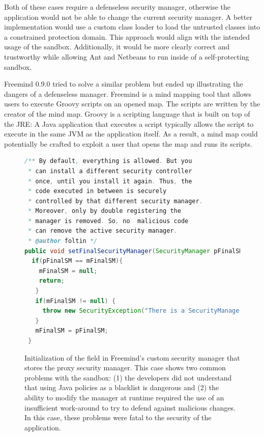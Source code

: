 \documentclass{sig-alternate}
\begin{document}
Both of these cases require a defenseless security manager, otherwise
the application would not be able to change the current security manager.
A better implementation would use a custom class
loader to load the untrusted classes into a constrained protection
domain. This approach would align with the intended usage of the sandbox.
Additionally, it would be more clearly correct and trustworthy while
allowing Ant and Netbeans to run inside of a self-protecting sandbox.

Freemind 0.9.0 tried to solve a similar problem but ended up illustrating
the dangers of a defenseless manager. Freemind is a mind mapping tool
that allows users to execute Groovy scripts on an opened map. The
scripts are written by the creator of the mind map. Groovy is a scripting
language that is built on top of the JRE: A Java application that
executes a script typically allows the script to execute in the same
JVM as the application itself. As a result, a mind map could potentially
be crafted to exploit a user that opens the map and runs its scripts.

\begin{figure}
\begin{lstlisting}[language=Java,firstnumber=31]
/** By default, everything is allowed. But you
 * can install a different security controller
 * once, until you install it again. Thus, the
 * code executed in between is securely
 * controlled by that different security manager.  
 * Moreover, only by double registering the
 * manager is removed. So, no  malicious code 
 * can remove the active security manager.  
 * @author foltin */
public void setFinalSecurityManager(SecurityManager pFinalSM) {
  if(pFinalSM == mFinalSM){
    mFinalSM = null;
    return;
   } 		
   if(mFinalSM != null) {
     throw new SecurityException("There is a SecurityManager installed already."); 		
   } 		
   mFinalSM = pFinalSM;
 }	
\end{lstlisting}
\caption{Initialization of the field in Freemind's custom security manager\label{fig:Freemind-Security-Manager}
that stores the proxy security manager. This case shows two common problems with the sandbox: (1) the developers did not understand that using Java policies as a blacklist is dangerous and (2) the ability to modify the manager at runtime required the use of an insufficient work-around to try to defend against malicious changes. In this case, these problems were fatal to the security of the application.}
\end{figure}
\end{document}
